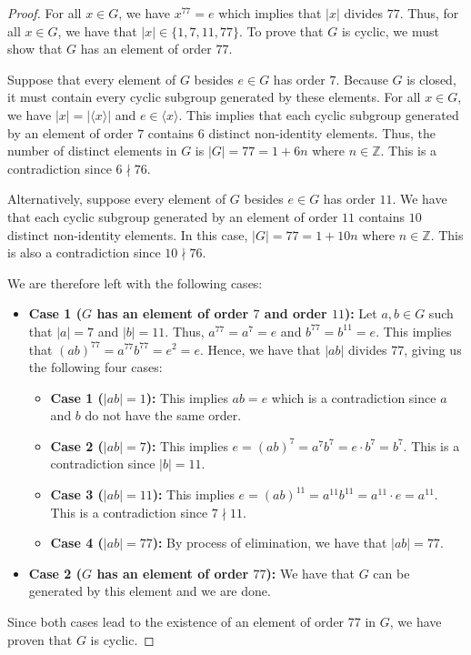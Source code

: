 \documentclass[12pt,reqno]{article}
\newcommand{\Z}{\mathbb{Z}}
\theoremstyle{plain}
\theoremstyle{definition}
\begin{document}
\begin{proof}
    For all \(x\in G\), we have \(x^{77}=e\) which implies that \(|x|\) divides \(77\). Thus, 
    for all \(x\in G\), we have that \(|x|\in\{1,7,11,77\}\). To prove that \(G\) is cyclic, we must show that 
    \(G\) has an element of order \(77\).

    Suppose that every element of \(G\) besides \(e\in G\) has order \(7\). Because \(G\) is closed,
    it must contain every cyclic subgroup generated by these elements. For all \(x\in G\), we have \(|x|=|\langle x\rangle|\)
    and \(e\in\langle x\rangle\). This implies that each cyclic subgroup generated by an element of order \(7\) contains \(6\) distinct non-identity elements. 
    Thus, the number of distinct elements in \(G\) is \(|G|=77=1 + 6n\) where \(n\in\Z\). This is a contradiction since \(6\nmid 76\).

    Alternatively, suppose every element of \(G\) besides \(e\in G\) has order \(11\). We have that each cyclic
    subgroup generated by an element of order \(11\) contains \(10\) distinct non-identity elements. In this case,
    \(|G|=77=1+10n\) where \(n\in\Z\). This is also a contradiction since \(10\nmid 76\).

    We are therefore left with the following cases:
    \begin{itemize}
        \item \textbf{Case 1 (\(G\) has an element of order \(7\) and order \(11\)):} Let \(a,b\in G\) such that
        \(|a|=7\) and \(|b|=11\). Thus, \(a^{77}=a^7=e\) and \(b^{77}=b^{11}=e\). This implies that
        \((ab)^{77}=a^{77}b^{77}=e^2=e\). Hence, we have that \(|ab|\) divides \(77\), giving us the following four cases:
        
        \begin{itemize}
            \item \textbf{Case 1 (\(|ab|=1\)):} This implies \(ab=e\) which is a contradiction since \(a\) and \(b\) do not have the same order.
            \item \textbf{Case 2 (\(|ab|=7\)):} This implies \(e=(ab)^7=a^7b^7=e\cdot b^7=b^7\). This is a contradiction since \(|b|=11\).
            \item \textbf{Case 3 (\(|ab|=11\)):} This implies \(e=(ab)^{11}=a^{11}b^{11}=a^{11}\cdot e=a^{11}\). This is a contradiction since \(7\nmid 11\).
            \item \textbf{Case 4 (\(|ab|=77\)):} By process of elimination, we have that \(|ab|=77\).
        \end{itemize}


        \item \textbf{Case 2 (\(G\) has an element of order \(77\)):} We have that \(G\) can be generated
        by this element and we are done.
    \end{itemize}
    Since both cases lead to the existence of an element of order \(77\) in \(G\), we have
    proven that \(G\) is cyclic.
\end{proof}
\end{document}
